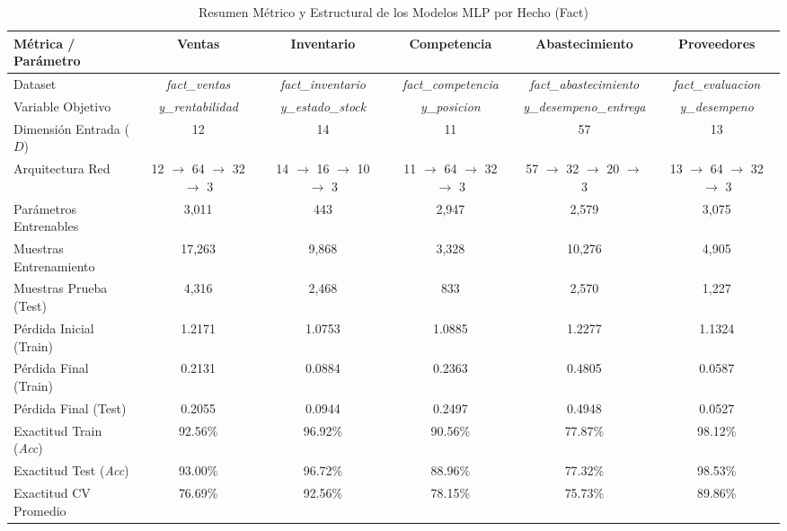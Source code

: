 \documentclass{article}
\begin{document}
\begin{table}[H]
\centering
\small
\caption{Resumen Métrico y Estructural de los Modelos MLP por Hecho (Fact)}
\begin{tabular}{lccccc}
\toprule
\textbf{Métrica / Parámetro} & \textbf{Ventas} & \textbf{Inventario} & \textbf{Competencia} & \textbf{Abastecimiento} & \textbf{Proveedores} \\
\midrule
Dataset & \textit{fact\_ventas} & \textit{fact\_inventario} & \textit{fact\_competencia} & \textit{fact\_abastecimiento} & \textit{fact\_evaluacion} \\
Variable Objetivo & \textit{y\_rentabilidad} & \textit{y\_estado\_stock} & \textit{y\_posicion} & \textit{y\_desempeno\_entrega} & \textit{y\_desempeno} \\
Dimensión Entrada ($D$) & 12 & 14 & 11 & 57 & 13 \\
Arquitectura Red & 12 $\to$ 64 $\to$ 32 $\to$ 3 & 14 $\to$ 16 $\to$ 10 $\to$ 3 & 11 $\to$ 64 $\to$ 32 $\to$ 3 & 57 $\to$ 32 $\to$ 20 $\to$ 3 & 13 $\to$ 64 $\to$ 32 $\to$ 3 \\
Parámetros Entrenables & 3,011 & 443 & 2,947 & 2,579 & 3,075 \\
Muestras Entrenamiento & 17,263 & 9,868 & 3,328 & 10,276 & 4,905 \\
Muestras Prueba (Test) & 4,316 & 2,468 & 833 & 2,570 & 1,227 \\
Pérdida Inicial (Train) & 1.2171 & 1.0753 & 1.0885 & 1.2277 & 1.1324 \\
Pérdida Final (Train) & 0.2131 & 0.0884 & 0.2363 & 0.4805 & 0.0587 \\
Pérdida Final (Test) & 0.2055 & 0.0944 & 0.2497 & 0.4948 & 0.0527 \\
Exactitud Train (\textit{Acc}) & 92.56\% & 96.92\% & 90.56\% & 77.87\% & 98.12\% \\
Exactitud Test (\textit{Acc}) & 93.00\% & 96.72\% & 88.96\% & 77.32\% & 98.53\% \\
Exactitud CV Promedio & 76.69\% & 92.56\% & 78.15\% & 75.73\% & 89.86\% \\
\bottomrule
\end{tabular}
\label{tab:resumen_modelos}
\end{table}
\end{document}
